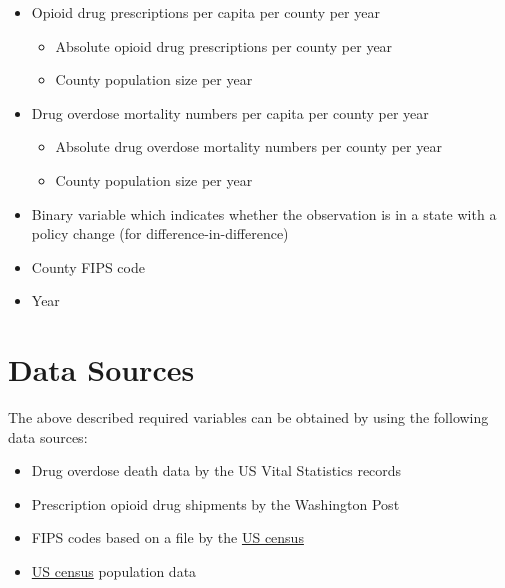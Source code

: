 \documentclass[12pt]{article}
\begin{document}
\begin{itemize}

\item Opioid drug prescriptions per capita per county per year
	\begin{itemize}
	\item Absolute opioid drug prescriptions per county per year
	\item County population size per year
	\end{itemize}
\item Drug overdose mortality numbers per capita per county per year
	\begin{itemize}
	\item Absolute drug overdose mortality numbers per county per year
	\item County population size per year
	\end{itemize}
\item Binary variable which indicates whether the observation is in a state with a policy change (for difference-in-difference)

\item County FIPS code

\item Year



\end{itemize}

\section{Data Sources}



The above described required variables can be obtained by using the following data sources:

\begin{itemize}
	\item Drug overdose death data by the US Vital Statistics records
	\item Prescription opioid drug shipments by the Washington Post
	\item FIPS codes based on a file by the \href{https://www2.census.gov/geo/docs/reference/codes/files/national_county.txt}{US census}
	\item \href{https://www.census.gov/programs-surveys/popest/data.html}{US census} population data
\end{itemize}
\end{document}
